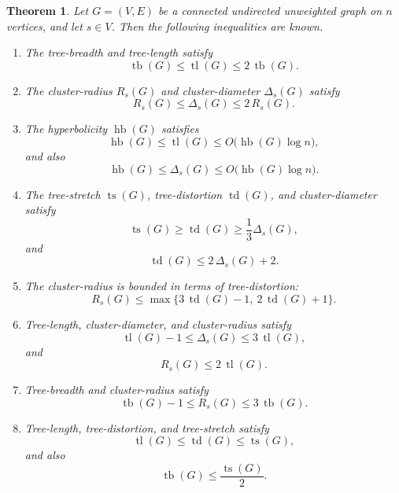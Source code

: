 \documentclass[10pt]{book}
\newtheorem{theorem}{Theorem}[section]
\theoremstyle{definition}
\DeclareMathOperator{\tl}{tl}
\DeclareMathOperator{\tb}{tb}
\begin{document}
\begin{theorem}
\label{thm:length-parameter-relations}
Let \(G=(V,E)\) be a connected undirected unweighted graph on \(n\) vertices, and let \(s\in V\).  
Then the following inequalities are known.
\begin{enumerate}
    \item The tree-breadth and tree-length satisfy
    \[
    \tb(G)\le \tl(G)\le 2\,\tb(G).
    \]

    \item The cluster-radius \(R_s(G)\) and cluster-diameter \(\Delta_s(G)\) satisfy
    \[
    R_s(G)\le \Delta_s(G)\le 2\,R_s(G).
    \]

    \item The hyperbolicity \(\operatorname{hb}(G)\) satisfies
    \[
    \operatorname{hb}(G)\le \tl(G)\le O\!\bigl(\operatorname{hb}(G)\log n\bigr),
    \]
    and also
    \[
    \operatorname{hb}(G)\le \Delta_s(G)\le O\!\bigl(\operatorname{hb}(G)\log n\bigr).
    \]
    \cite{chepoi2008diameters,chepoi2012additive}

    \item The tree-stretch \(\operatorname{ts}(G)\), tree-distortion \(\operatorname{td}(G)\), and cluster-diameter satisfy
    \[
    \operatorname{ts}(G)\ge \operatorname{td}(G)\ge \frac{1}{3}\Delta_s(G),
    \]
    and
    \[
    \operatorname{td}(G)\le 2\,\Delta_s(G)+2.
    \]
    \cite{chepoi2012constant}

    \item The cluster-radius is bounded in terms of tree-distortion:
    \[
    R_s(G)\le \max\{3\,\operatorname{td}(G)-1,\ 2\,\operatorname{td}(G)+1\}.
    \]
    \cite{chepoi2012constant}

    \item Tree-length, cluster-diameter, and cluster-radius satisfy
    \[
    \tl(G)-1\le \Delta_s(G)\le 3\,\tl(G),
    \]
    and
    \[
    R_s(G)\le 2\,\tl(G).
    \]
    \cite{dourisboure2007tree,dourisboure2007spanners}

    \item Tree-breadth and cluster-radius satisfy
    \[
    \tb(G)-1\le R_s(G)\le 3\,\tb(G).
    \]
    \cite{dragan2014approximation}

    \item Tree-length, tree-distortion, and tree-stretch satisfy
    \[
    \tl(G)\le \operatorname{td}(G)\le \operatorname{ts}(G),
    \]
    and also
    \[
    \tb(G)\le \frac{\operatorname{ts}(G)}{2}.
    \]
    \cite{dragan2014approximation}


\end{enumerate}
\end{theorem}
\end{document}
